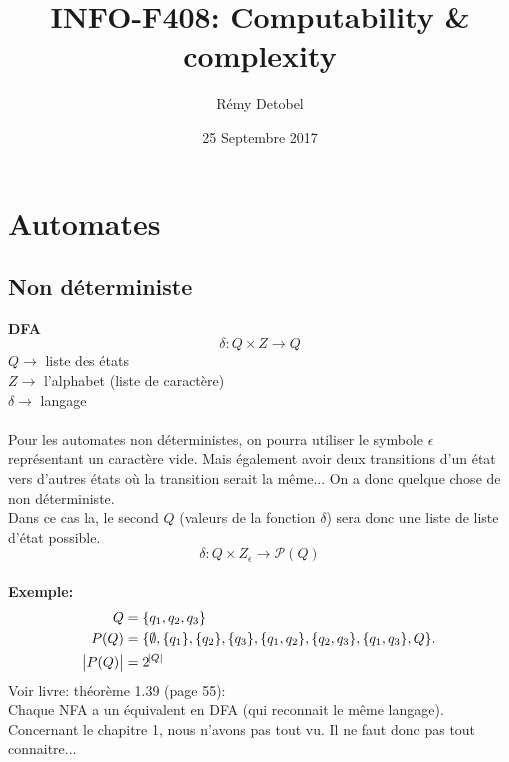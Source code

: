 \documentclass[a4paper,12pt]{article}
\title{INFO-F408: Computability \& complexity}
\author{Rémy Detobel}
\date{25 Septembre 2017}
\begin{document}
\maketitle
\newpage

\section{Automates}
  \subsection{Non déterministe}
    \textbf{DFA}
    $$\delta : Q \times Z \rightarrow Q$$
    $Q \rightarrow$ liste des états\\
    $Z \rightarrow$ l'alphabet (liste de caractère)\\
    $\delta \rightarrow$ langage\\
    \\
    Pour les automates non déterministes, on pourra utiliser le symbole $\epsilon$ représentant un caractère vide.  Mais également avoir deux transitions d'un état vers d'autres états où la transition serait la même...  On a donc quelque chose de non déterministe.\\
    Dans ce cas la, le second $Q$ (valeurs de la fonction $\delta$) sera donc une liste de liste d'état possible.\\
    $$\delta : Q \times Z_{\epsilon} \rightarrow \mathcal P(Q)$$
		\\
    \textbf{Exemple:}\\
    \begin{align*}
      Q &= \{q_1, q_2, q_3\}\\
      P(Q) &= \{\emptyset, \{q_1\}, \{q_2\}, \{q_3\}, \{q_1, q_2\}, \{q_2, q_3\}, \{q_1, q_3\}, Q\}.\\
      \abs {P(Q)} &= 2^{\abs Q}
    \end{align*}
    Voir livre: théorème 1.39 (page 55):\\
    Chaque NFA a un équivalent en DFA (qui reconnait le même langage).\\
    Concernant le chapitre 1, nous n'avons pas tout vu. Il ne faut donc pas tout connaitre...
\end{document}
